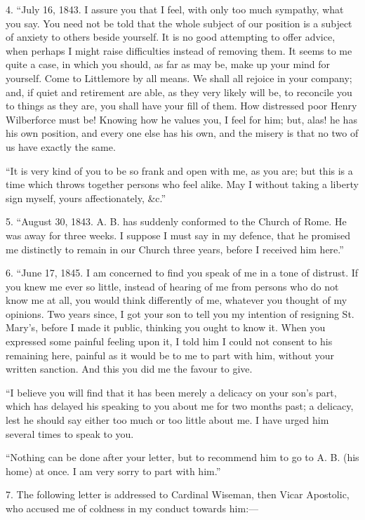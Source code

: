 4. ``July 16, 1843. I assure you that I feel, with only
too much sympathy, what you say. You need not be told that the whole
subject of our position is a subject of anxiety to others beside
yourself. It is no good attempting to offer advice, when perhaps I might
raise difficulties instead of removing them. It seems to me quite a
case, in which you should, as far as may be, make up your mind for
yourself. Come to Littlemore by all means. We shall all rejoice in your
company; and, if quiet and retirement are able, as they very likely will
be, to reconcile you to things as they are, you shall have your fill of
them. How distressed poor Henry Wilberforce must be! Knowing how he
values you, I feel for him; but, alas! he has his own position, and
every one else has his own, and the misery is that no two of us have
exactly the same.

``It is very kind of you to be so frank and open with me,
as you are; but this is a time which throws together persons who feel
alike. May I without taking a liberty sign myself, yours affectionately,
\&c.''

5. ``August 30, 1843. A. B. has suddenly conformed to the Church
of Rome. He was away for three weeks. I suppose I must say in my defence,
that he promised me distinctly to remain in our Church three years,
before I received him here.''

6. ``June 17, 1845. I am concerned to find you
speak of me in a tone of distrust. If you knew me ever so little,
instead of hearing of me from persons who do not know me at all, you
would think differently of me, whatever you thought of my opinions. Two
years since, I got your son to tell you my intention of resigning St.
Mary's, before I made it public, thinking you ought to know it. When you
expressed some painful feeling upon it, I told him I could not consent
to his remaining here, painful as it would be to me to part with him,
without your written sanction. And this you did me the favour to give.

``I believe you will find that it has been merely a delicacy on
your son's part, which has delayed his speaking to you about me for two
months past; a delicacy, lest he should say either too much or too
little about me. I have urged him several times to speak to you.

``Nothing can be done after your letter, but to recommend him to
go to A. B. (his home) at once. I am very sorry to part with him.''

7. The following letter is addressed to Cardinal Wiseman, then Vicar
Apostolic, who accused me of coldness in my conduct towards him:—

